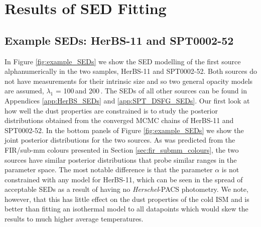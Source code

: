 \section{Results of SED Fitting}

\subsection{Example SEDs: HerBS-11 and SPT0002-52}

In Figure \ref{fig:example_SEDs} we show the SED modelling of the first source alphanumerically in the two samples, HerBS-11 and SPT0002-52. Both sources do not have measurements for their intrinsic size and so two general opacity models are assumed, $\lambda_1$ = 100\,\micron and 200\,\micron. The SEDs of all other sources can be found in Appendices \ref{app:HerBS_SEDs} and \ref{app:SPT_DSFG_SEDs}. Our first look at how well the dust properties are constrained is to study the posterior distributions obtained from the converged MCMC chains of HerBS-11 and SPT0002-52. In the bottom panels of Figure \ref{fig:example_SEDs} we show the joint posterior distributions for the two sources. As was predicted from the FIR/sub-mm colours presented in Section \ref{sec:fir_submm_colours}, the two sources have similar posterior distributions that probe similar ranges in the parameter space. The most notable difference is that the parameter $\alpha$ is not constrained with any model for HerBS-11, which can be seen in the spread of acceptable SEDs as a result of having no \textit{Herschel}-PACS photometry. We note, however, that this has little effect on the dust properties of the cold ISM and is better than fitting an isothermal model to all datapoints which would skew the results to much higher average temperatures. 

